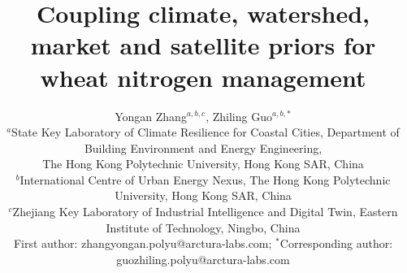 \documentclass[11pt,a4paper]{article}
\begin{document}
\title{Coupling climate, watershed, market and satellite priors for wheat nitrogen management}

\author{Yongan Zhang$^{a,b,c}$, Zhiling Guo$^{a,b,*}$\\\footnotesize $^{a}$State Key Laboratory of Climate Resilience for Coastal Cities, Department of Building Environment and Energy Engineering,\\\footnotesize The Hong Kong Polytechnic University, Hong Kong SAR, China\\\footnotesize $^{b}$International Centre of Urban Energy Nexus, The Hong Kong Polytechnic University, Hong Kong SAR, China\\\footnotesize $^{c}$Zhejiang Key Laboratory of Industrial Intelligence and Digital Twin, Eastern Institute of Technology, Ningbo, China\\\footnotesize First author: zhangyongan.polyu@arctura-labs.com; $^{*}$Corresponding author: guozhiling.polyu@arctura-labs.com}

\date{}

\maketitle
\end{document}
